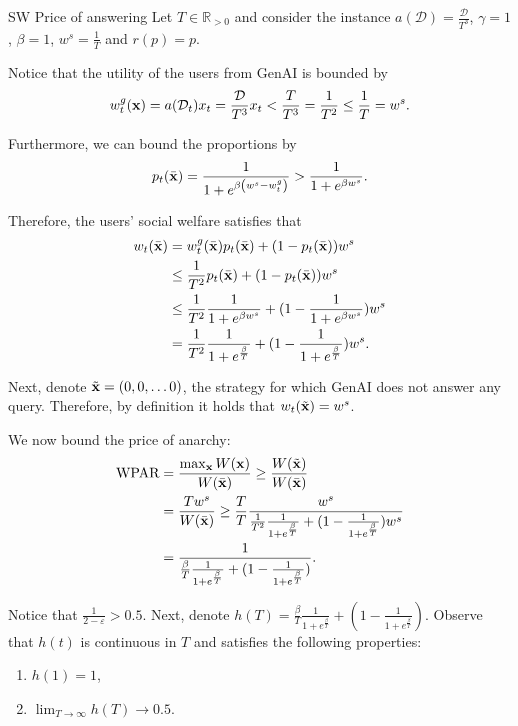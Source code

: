 \begin{proofof}{SW Price of answering}
Let $T \in \mathbb{R}_{>0}$ and consider the instance $a(\mathcal{D}) = \frac{\mathcal{D}}{T^3}$, $\gamma = 1$, $\beta = 1$, $w^s = \frac{1}{T}$ and $r(p) = p$.

Notice that the utility of the users from GenAI is bounded by
\begin{align*}
w^g_t({\bf{x}}) = a(\mathcal{D}_t) x_t = \frac{\mathcal{D}}{T^3} x_t < \frac{T}{T^3} = \frac{1}{T^2} \leq \frac{1}{T} = w^s.
\end{align*}

Furthermore, we can bound the proportions by
\begin{align*}
p_t(\Bar{{\bf{x}}}) = \frac{1}{1 + e^{\beta \left(w^s - w^g_t\right)}} > \frac{1}{1 + e^{\beta w^s}}.
\end{align*}

Therefore, the users' social welfare satisfies that
\begin{align*}
w_t(\Bar{{\bf{x}}}) &= w^g_t(\Bar{{\bf{x}}}) p_t(\Bar{{\bf{x}}}) + (1-p_t(\Bar{{\bf{x}}})) w^s \\
& \leq \frac{1}{T^2} p_t(\Bar{{\bf{x}}}) + (1-p_t(\Bar{{\bf{x}}})) w^s \\
& \leq \frac{1}{T^2}  \frac{1}{1 + e^{\beta w^s}} + (1- \frac{1}{1 + e^{\beta w^s}}) w^s \\
&= \frac{1}{T^2}  \frac{1}{1 + e^{\frac{\beta}{T}}} + (1- \frac{1}{1 + e^{\frac{\beta}{T} }}) w^s.
\end{align*}

Next, denote $\tilde{{\bf{x}}} = (0, 0, \ldots 0)$, the strategy for which GenAI does not answer any query. Therefore, by definition it holds that $w_t(\tilde{{\bf{x}}}) = w^s$.

We now bound the price of anarchy:
\begin{align*}
\textnormal{WPAR} &= \frac{\max_{{\bf{x}}}W({\bf{x}})}{W(\Bar{{\bf{x}}})} \geq \frac{W(\tilde{{\bf{x}}})}{W(\Bar{{\bf{x}}})} \\
&=  \frac{T w^s}{W(\Bar{{\bf{x}}})} \geq \frac{T}{T} \frac{w^s}{\frac{1}{T^2}  \frac{1}{1 + e^{\frac{\beta}{T}}} + (1- \frac{1}{1 + e^{\frac{\beta}{T} }}) w^s} \\
&= \frac{1}{\frac{\beta}{T}  \frac{1}{1 + e^{\frac{\beta}{T}}} + (1- \frac{1}{1 + e^{\frac{\beta}{T} }})}.
\end{align*}

Notice that $\frac{1}{2 - \varepsilon} > 0.5$. Next, denote $h(T) = \frac{\beta}{T}  \frac{1}{1 + e^{\frac{\beta}{T}}} + (1- \frac{1}{1 + e^{\frac{\beta}{T} }})$. Observe that $h(t)$ is continuous in $T$ and satisfies the following properties:
\begin{enumerate}
    \item $h(1) = 1$,
    \item $\lim_{T \rightarrow \infty} h(T) \rightarrow 0.5$.
\end{enumerate}


\end{proofof}
